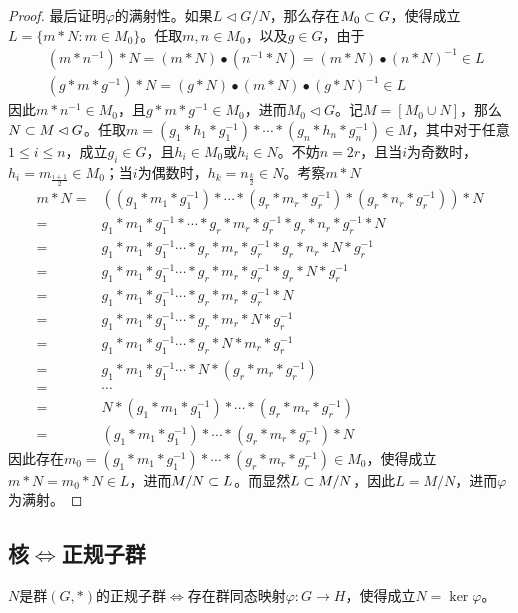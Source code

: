 \begin{proof}
	最后证明$\varphi$的满射性。如果$L\lhd G/N$，那么存在$M_0\subset G$，使得成立$L=\{ m*N:m\in M_0 \}$。任取$m,n\in M_0$，以及$g\in G$，由于
	\begin{align*}
		&(m*n^{-1})*N=(m*N)\bullet(n^{-1}*N)=(m*N)\bullet(n*N)^{-1}\in L\\
		&(g*m*g^{-1})*N=(g*N)\bullet(m*N)\bullet(g*N)^{-1}\in L
	\end{align*}
	因此$m*n^{-1}\in M_0$，且$g*m*g^{-1}\in M_0$，进而$M_0\lhd G$。记$M=[M_0\cup N]$，那么$N\subset M\lhd G$。任取$m=(g_1*h_1*g_1^{-1})*\cdots* (g_n*h_n*g_n^{-1})\in M$，其中对于任意$1\le i\le n$，成立$g_i\in G$，且$h_i\in M_0$或$h_i\in N$。不妨$n=2r$，且当$i$为奇数时，$h_i=m_{\frac{i+1}{2}}\in M_0$；当$i$为偶数时，$h_k=n_{\frac{k}{2}}\in N$。考察$m*N$
	\begin{align*}
		m*N=&((g_1*m_1*g_1^{-1})*\cdots* (g_{r}*m_{r}*g_{r}^{-1})*(g_r*n_r*g_r^{-1}))*N\\
		= & g_1*m_1*g_1^{-1}*\cdots* g_{r}*m_{r}*g_{r}^{-1}*g_r*n_r*g_r^{-1}*N\\
		= & g_1*m_1*g_1^{-1}\cdots* g_{r}*m_{r}*g_{r}^{-1}*g_r*n_r*N*g_r^{-1}\\
		= & g_1*m_1*g_1^{-1}\cdots* g_{r}*m_{r}*g_{r}^{-1}*g_r*N*g_r^{-1}\\
		= & g_1*m_1*g_1^{-1}\cdots* g_{r}*m_{r}*g_{r}^{-1}*N\\
		= & g_1*m_1*g_1^{-1}\cdots* g_{r}*m_{r}*N*g_{r}^{-1}\\
		= & g_1*m_1*g_1^{-1}\cdots* g_{r}*N*m_{r}*g_{r}^{-1}\\
		= & g_1*m_1*g_1^{-1}\cdots*N* (g_{r}*m_{r}*g_{r}^{-1})\\
		= & \cdots\\
		= & N*(g_{1}*m_{1}*g_{1}^{-1})*\cdots*(g_{r}*m_{r}*g_{r}^{-1})\\
		= & (g_{1}*m_{1}*g_{1}^{-1})*\cdots*(g_{r}*m_{r}*g_{r}^{-1})*N
	\end{align*}
	因此存在$m_0=(g_{1}*m_{1}*g_{1}^{-1})*\cdots*(g_{r}*m_{r}*g_{r}^{-1})\in M_0$，使得成立$m*N=m_0*N\in L$，进而$M/N\subset L$。而显然$L\subset M/N$，因此$L=M/N$，进而$\varphi$为满射。
\end{proof}

\subsection{核$\iff$正规子群}

\begin{theorem}
	$N$是群$(G,*)$的正规子群$\iff $存在群同态映射$\varphi:G\to H$，使得成立$N=\ker\varphi$。
\end{theorem}

